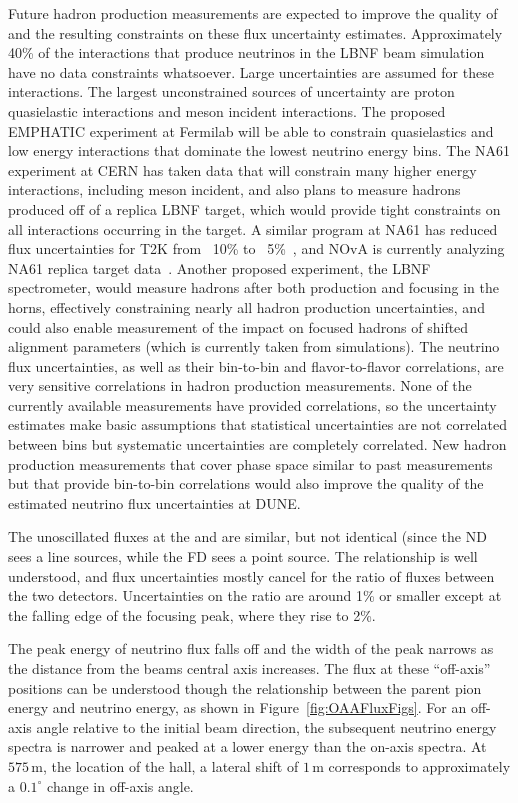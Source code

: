  Future hadron production measurements are expected to improve the quality of and the resulting constraints on these flux uncertainty estimates.  Approximately 40\% of the interactions that produce neutrinos in the LBNF beam simulation have no data constraints whatsoever.  Large uncertainties are assumed for these interactions. The largest unconstrained sources of uncertainty are proton quasielastic interactions and meson incident interactions.  The proposed EMPHATIC experiment at Fermilab will be able to constrain quasielastics and low energy interactions that dominate the lowest neutrino energy bins.  The NA61 experiment at CERN has taken data that will constrain many higher energy interactions, including meson incident, and also plans to measure hadrons produced off of a replica LBNF target, which would provide tight constraints on all interactions occurring in the target.  A similar program at NA61 has reduced flux uncertainties for T2K from ~10\% to ~5\%~\cite{Vladisavljevic:2018prd}, and NOvA is currently analyzing NA61 replica target data~\cite{Aduszkiewicz:2222876}.  Another proposed experiment, the LBNF spectrometer, would measure hadrons after both production and focusing in the horns, effectively constraining nearly all hadron production uncertainties, and could also enable measurement of the impact on focused hadrons of shifted alignment parameters (which is currently taken from simulations).  
The neutrino flux uncertainties, as well as their bin-to-bin and  flavor-to-flavor correlations, are very sensitive correlations in hadron production measurements.  None of the currently available measurements have provided correlations, so the uncertainty estimates make basic assumptions that statistical uncertainties are not correlated between bins but systematic uncertainties are completely correlated.  New hadron production measurements that cover phase space similar to past measurements but that provide bin-to-bin correlations would also improve the quality of the estimated neutrino flux uncertainties at DUNE.     

The unoscillated fluxes at the  and  are similar, but not identical (since the ND sees a line sources, while the FD sees a point source. The relationship is well understood, and flux uncertainties mostly cancel for the ratio of fluxes between the two detectors.  Uncertainties on the ratio are around 1\% or smaller except at the falling edge of the focusing peak, where they rise to 2\%.    

The peak energy of neutrino flux falls off and the width of the peak narrows as the distance from the beams central axis increases. The flux at these ``off-axis'' positions can be understood though the relationship between the parent pion energy and neutrino energy, as shown in Figure~\ref{fig:OAAFluxFigs}. For an off-axis angle relative to the initial beam direction, the subsequent neutrino energy spectra is narrower and peaked at a lower energy than the on-axis spectra. At $575\,\textrm{m}$, the location of the  hall, a lateral shift of $1\,\textrm{m}$ corresponds to approximately a $0.1^\circ$ change in off-axis angle.

